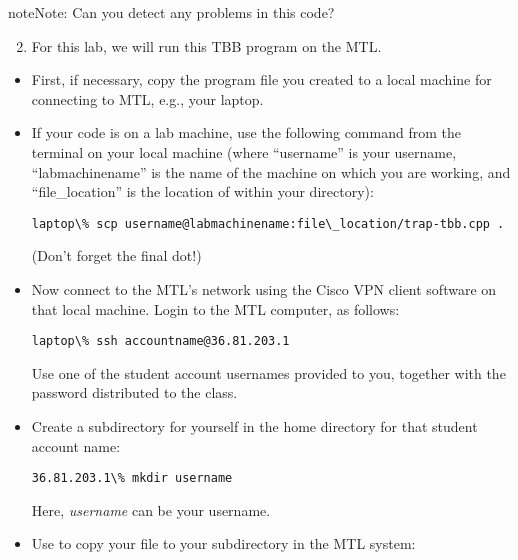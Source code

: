 \documentclass[letterpaper,10pt,openany,oneside]{sphinxmanual}
\begin{document}
\begin{notice}{note}{Note:}
Can you detect any problems in this code?
\end{notice}
\begin{enumerate}
\setcounter{enumi}{1}
\item {} 
For this lab, we will run this TBB program on the MTL.

\end{enumerate}
\begin{itemize}
\item {} 
First, if necessary, copy the program file you created to a local machine for connecting to MTL, e.g., your laptop.

\item {} 
If your code is on a lab machine, use the following command from the terminal on your local machine (where “username” is your username, “labmachinename” is the name of the machine on which you are working, and “file\_location” is the location of  within your directory):

\begin{Verbatim}[commandchars=\\\{\}]
laptop\% scp username@labmachinename:file\_location/trap-tbb.cpp .
\end{Verbatim}

(Don't forget the final dot!)

\item {} 
Now connect to the MTL's network using the Cisco VPN client software on that local machine.  Login to the MTL computer, as follows:

\begin{Verbatim}[commandchars=\\\{\}]
laptop\% ssh accountname@36.81.203.1
\end{Verbatim}

Use one of the student account usernames provided to you, together with the password distributed to the class.

\item {} 
Create a subdirectory for yourself in the home directory for that student account name:

\begin{Verbatim}[commandchars=\\\{\}]
36.81.203.1\% mkdir username
\end{Verbatim}

Here, \emph{username} can be your username.

\item {} 
Use  to copy your file to your subdirectory in the MTL system:


\end{itemize}
\end{document}

